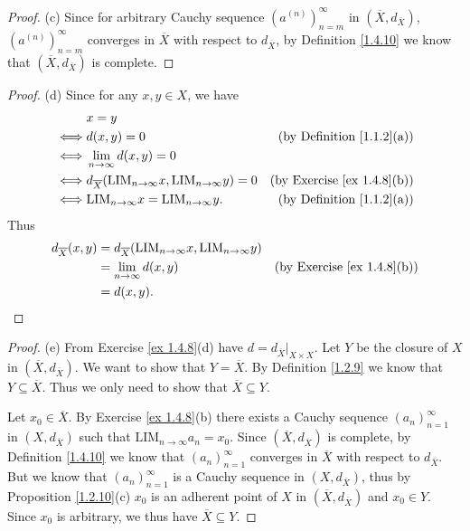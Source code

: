\begin{proof}{(c)}
    Since for arbitrary Cauchy sequence \((a^{(n)})_{n = m}^\infty\) in \((\overline{X}, d_{\overline{X}})\), \((a^{(n)})_{n = m}^\infty\) converges in \(\overline{X}\) with respect to \(d_{\overline{X}}\), by Definition \ref{1.4.10} we know that \((\overline{X}, d_{\overline{X}})\) is complete.
\end{proof}

\begin{proof}{(d)}
    Since for any \(x, y \in X\), we have
    \begin{align*}
             & x = y                                                                                                                   \\
        \iff & d(x, y) = 0                                                                    & \text{(by Definition \ref{1.1.2}(a))}  \\
        \iff & \lim_{n \to \infty} d(x, y) = 0                                                                                         \\
        \iff & d_{\overline{X}}(\text{LIM}_{n \to \infty} x, \text{LIM}_{n \to \infty} y) = 0 & \text{(by Exercise \ref{ex 1.4.8}(b))} \\
        \iff & \text{LIM}_{n \to \infty} x = \text{LIM}_{n \to \infty} y.                     & \text{(by Definition \ref{1.1.2}(a))}
    \end{align*}
    Thus
    \begin{align*}
        d_{\overline{X}}(x, y) & = d_{\overline{X}}(\text{LIM}_{n \to \infty} x, \text{LIM}_{n \to \infty} y)                                          \\
                               & = \lim_{n \to \infty} d(x, y)                                                & \text{(by Exercise \ref{ex 1.4.8}(b))} \\
                               & = d(x, y).
    \end{align*}
\end{proof}

\begin{proof}{(e)}
    From Exercise \ref{ex 1.4.8}(d) have \(d = d_{\overline{X}}|_{X \times X}\).
    Let \(Y\) be the closure of \(X\) in \((\overline{X}, d_{\overline{X}})\).
    We want to show that \(Y = \overline{X}\).
    By Definition \ref{1.2.9} we know that \(Y \subseteq \overline{X}\).
    Thus we only need to show that \(\overline{X} \subseteq Y\).

    Let \(x_0 \in \overline{X}\).
    By Exercise \ref{ex 1.4.8}(b) there exists a Cauchy sequence \((a_n)_{n = 1}^\infty\) in \((X, d_{\overline{X}})\) such that \(\text{LIM}_{n \to \infty} a_n = x_0\).
    Since \((\overline{X}, d_{\overline{X}})\) is complete, by Definition \ref{1.4.10} we know that \((a_n)_{n = 1}^\infty\) converges in \(\overline{X}\) with respect to \(d_{\overline{X}}\).
    But we know that \((a_n)_{n = 1}^\infty\) is a Cauchy sequence in \((X, d_{\overline{X}})\), thus by Proposition \ref{1.2.10}(c) \(x_0\) is an adherent point of \(X\) in \((\overline{X}, d_{\overline{X}})\) and \(x_0 \in Y\).
    Since \(x_0\) is arbitrary, we thus have \(\overline{X} \subseteq Y\).
\end{proof}

